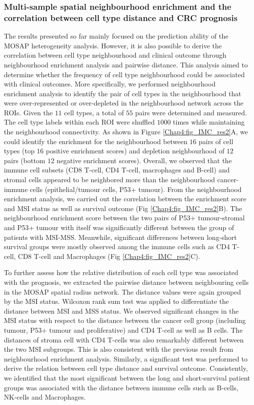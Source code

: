 \subsubsection{Multi-sample spatial neighbourhood enrichment and the correlation between cell type distance and CRC prognosis}
The results presented so far mainly focused on the prediction ability of the MOSAP heterogeneity analysis. However, it is also possible to derive the correlation between cell type neighbourhood and clinical outcome through neighbourhood enrichment analysis and pairwise distance. This analysis aimed to determine whether the frequency of cell type neighbourhood could be associated with clinical outcomes. More specifically, we performed neighbourhood enrichment analysis to identify the pair of cell types in the neighbourhood that were over-represented or over-depleted in the neighbourhood network across the ROIs. Given the $11$ cell types, a total of $55$ pairs were determined and measured. The cell type labels within each ROI were shuffled $1000$ times while maintaining the neighbourhood connectivity. As shown in Figure \ref{Chap4:fig_IMC_res2}A, we could identify the enrichment for the neighbourhood between $16$ pairs of cell types (top $16$ positive enrichment scores) and depletion neighbourhood of $12$ pairs (bottom $12$ negative enrichment scores). Overall, we observed that the immune cell subsets (\ie CD8 T-cell, CD4 T-cell, macrophages and B-cell) and stromal cells appeared to be neighbored more than the neighbourhood cancer-immune cells (\ie epithelial/tumour cells, P53+ tumour). From the neighbourhood enrichment analysis, we carried out the correlation between the enrichment score and MSI status as well as survival outcome (Fig \ref{Chap4:fig_IMC_res2}B). The neighbourhood enrichment score between the two pairs of P53+ tumour-stromal and P53+ tumour with itself was significantly different between the group of patients with MSI-MSS. Meanwhile, significant differences between long-short survival groups were mostly observed among the immune cells such as CD4 T-cell, CD8 T-cell and Macrophages (Fig \ref{Chap4:fig_IMC_res2}C). 

To further assess how the relative distribution of each cell type was associated with the prognosis, we extracted the pairwise distance between neighbouring cells in the MOSAP spatial radius network. The distance values were again grouped by the MSI status. Wilcoxon rank sum test was applied to differentiate the distance between MSI and MSS status. We observed significant changes in the MSI status with respect to the distance between the cancer cell group (including tumour, P53+ tumour and proliferative) and CD4 T-cell as well as B cells. The distances of stroma cell with CD4 T-cells was also remarkably different between the two MSI subgroups. This is also consistent with the previous result from neighbourhood enrichment analysis. Similarly, a significant test was performed to derive the relation between cell type distance and survival outcome. Consistently, we identified that the most significant between the long and short-survival patient groups was associated with the distance between immune cells such as B-cells, NK-cells and Macrophages.  

